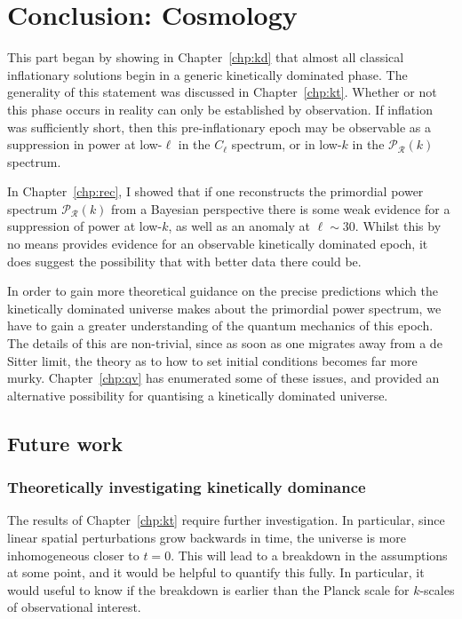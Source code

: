 \chapter*[Conclusion: Cosmology]{Conclusion: Cosmology}

This part began by showing in Chapter~\ref{chp:kd} that almost all classical inflationary solutions begin in a generic kinetically dominated phase. The generality of this statement was discussed in Chapter~\ref{chp:kt}. 
Whether or not this phase occurs in reality can only be established by observation. If inflation was sufficiently short, then this pre-inflationary epoch may be observable as a suppression in power at low-\(\ell\) in the \(C_\ell\) spectrum, or in low-\(k\) in the \(\mathcal{P}_\mathcal{R}(k)\) spectrum. 

In Chapter~\ref{chp:rec}, I showed that if one reconstructs the primordial power spectrum \(\mathcal{P}_\mathcal{R}(k)\) from a Bayesian perspective there is some weak evidence for a suppression of power at low-\(k\), as well as an anomaly at \(\ell\sim30\). Whilst this by no means provides evidence for an observable kinetically dominated epoch, it does suggest the possibility that with better data there could be.

In order to gain more theoretical guidance on the precise predictions which the kinetically dominated universe makes about the primordial power spectrum, we have to gain a greater understanding of the quantum mechanics of this epoch. The details of this are non-trivial, since as soon as one migrates away from a de Sitter limit, the theory as to how to set initial conditions becomes far more murky. Chapter~\ref{chp:qv} has enumerated some of these issues, and provided an alternative possibility for quantising a kinetically dominated universe.

\section*{Future work}
\subsection*{Theoretically investigating kinetically dominance}
The results of Chapter~\ref{chp:kt} require further investigation. In particular, since linear spatial perturbations grow backwards in time, the universe is more inhomogeneous closer to \(t=0\). This will lead to a breakdown in the assumptions at some point, and it would be helpful to quantify this fully. In particular, it would useful to know if the breakdown is earlier than the Planck scale for \(k\)-scales of observational interest.

